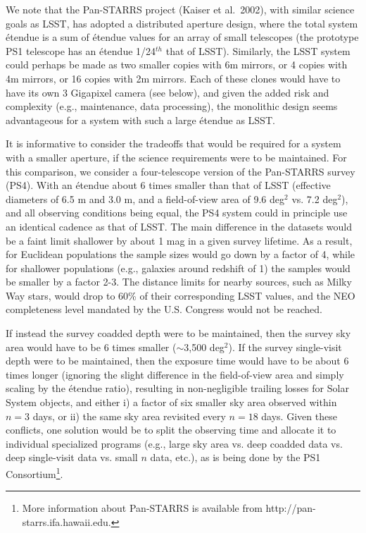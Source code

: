 We note that the Pan-STARRS project (Kaiser et al.~2002), with similar science
goals as LSST, has adopted a distributed aperture design, where the total
system \'etendue is
a sum of \'etendue values for an array of small telescopes (the prototype
PS1 telescope has an \'etendue 1/24$^{th}$ that of LSST).
Similarly, the LSST system could perhaps be made as two smaller copies with
6m mirrors, or 4 copies with 4m mirrors, or 16 copies with 2m mirrors. Each
of these clones would have to have its own 3 Gigapixel camera (see below), and
given the added risk and complexity (e.g., maintenance, data processing), the monolithic
design seems advantageous for a system with such a large \'etendue as LSST.

It is informative to consider the tradeoffs that would be required
for a system with a smaller aperture, if the science requirements were
to be maintained. For this comparison, we consider a four-telescope version of
the Pan-STARRS survey (PS4). With an \'etendue about 6 times smaller
than that of LSST (effective diameters of 6.5 m and 3.0 m, and a field-of-view area
of 9.6 deg$^2$ vs. 7.2 deg$^2$), and all observing conditions being equal,
the PS4 system could in principle use an identical cadence as that of LSST. The
main difference in the datasets would be a faint limit shallower by about
1 mag in a given survey lifetime. As a result, for Euclidean populations the
sample sizes would go down by a factor of 4, while for shallower populations (e.g.,
galaxies around redshift of 1) the samples would be smaller by a factor 2-3.
The distance limits for nearby sources, such as Milky Way stars, would drop to
60\% of their corresponding LSST values, and the NEO completeness level mandated by
the U.S. Congress would not be reached.

If instead the survey coadded depth were to be maintained, then the survey sky
area would have to be 6 times smaller ($\sim$3,500 deg$^2$). If the
survey single-visit depth were to be maintained, then the exposure
time would have to be about 6 times longer (ignoring the slight difference
in the field-of-view area and simply scaling by the \'etendue ratio),
resulting in non-negligible trailing losses for Solar System objects,
and either
i) a factor of six smaller sky area observed within $n=3$ days, or
ii) the same sky area revisited every $n=18$ days.
Given these conflicts, one solution would be to split the observing time and
allocate it to individual specialized programs (e.g., large sky area vs.
deep coadded data vs. deep single-visit data vs. small $n$ data, etc.),
as is being done by the PS1 Consortium\footnote{More information about
Pan-STARRS is available from http://pan-starrs.ifa.hawaii.edu.}.

